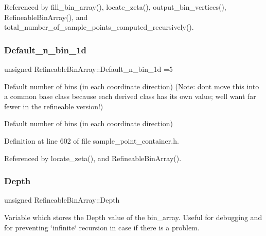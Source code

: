 Referenced by fill\+\_\+bin\+\_\+array(), locate\+\_\+zeta(), output\+\_\+bin\+\_\+vertices(), Refineable\+Bin\+Array(), and total\+\_\+number\+\_\+of\+\_\+sample\+\_\+points\+\_\+computed\+\_\+recursively().

\mbox{\label{classRefineableBinArray_a34a623036985925b9adc0b28c89ad1c2}} 
\subsubsection{\texorpdfstring{Default\+\_\+n\+\_\+bin\+\_\+1d}{Default\_n\_bin\_1d}}
{\footnotesize\ttfamily unsigned Refineable\+Bin\+Array\+::\+Default\+\_\+n\+\_\+bin\+\_\+1d =5\hspace{0.3cm}{\ttfamily [static]}}



Default number of bins (in each coordinate direction) (Note\+: don\textquotesingle{}t move this into a common base class because each derived class has its own value; we\textquotesingle{}ll want far fewer in the refineable version!) 

Default number of bins (in each coordinate direction) 

Definition at line 602 of file sample\+\_\+point\+\_\+container.\+h.



Referenced by locate\+\_\+zeta(), and Refineable\+Bin\+Array().

\mbox{\label{classRefineableBinArray_a5ecc65773101eced0ff7afe57fe04804}} 
\subsubsection{\texorpdfstring{Depth}{Depth}}
{\footnotesize\ttfamily unsigned Refineable\+Bin\+Array\+::\+Depth\hspace{0.3cm}{\ttfamily [private]}}



Variable which stores the Depth value of the bin\+\_\+array. Useful for debugging and for preventing \char`\"{}infinite\char`\"{} recursion in case if there is a problem. 



